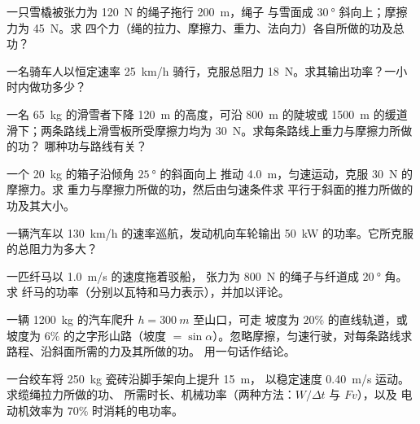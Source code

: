 \begin{exercise}[$\star\star$]\label{exo:g11:work-of-force:6}
一只雪橇被张力为 \qty{120}{N} 的绳子拖行 \qty{200}{m}，绳子
与雪面成 $\qty{30}{\degree}$ 斜向上；摩擦力为 \qty{45}{N}。求
四个力（绳的拉力、摩擦力、重力、法向力）各自所做的功及总功？
\end{exercise}

\begin{exercise}[$\star\star$]\label{exo:g11:work-of-force:7}
一名骑车人以恒定速率 \qty{25}{km/h} 骑行，克服总阻力
\qty{18}{N}。求其输出功率？一小时内做功多少？
\end{exercise}

\begin{exercise}[$\star\star$]\label{exo:g11:work-of-force:8}
一名 \qty{65}{kg} 的滑雪者下降 \qty{120}{m} 的高度，可沿 \qty{800}{m}
的陡坡或 \qty{1500}{m} 的缓道滑下；两条路线上滑雪板所受摩擦力均为
\qty{30}{N}。求每条路线上重力与摩擦力所做的功？
哪种功与路线有关？
\end{exercise}

\begin{exercise}[$\star\star$]\label{exo:g11:work-of-force:9}
一个 \qty{20}{kg} 的箱子沿倾角 $\qty{25}{\degree}$ 的斜面向上
推动 \qty{4.0}{m}，匀速运动，克服 \qty{30}{N} 的摩擦力。求
重力与摩擦力所做的功，然后由匀速条件求
平行于斜面的推力所做的功及其大小。
\end{exercise}

\begin{exercise}[$\star\star$]\label{exo:g11:work-of-force:10}
一辆汽车以 \qty{130}{km/h} 的速率巡航，发动机向车轮输出
\qty{50}{kW} 的功率。它所克服的总阻力为多大？
\end{exercise}

\begin{exercise}[$\star\star$]\label{exo:g11:work-of-force:11}
一匹纤马以 \qty{1.0}{m/s} 的速度拖着驳船，
张力为 \qty{800}{N} 的绳子与纤道成 $\qty{20}{\degree}$ 角。求
纤马的功率（分别以瓦特和马力表示），并加以评论。
\end{exercise}

\begin{exercise}[$\star\star\star$]\label{exo:g11:work-of-force:12}
一辆 \qty{1200}{kg} 的汽车爬升 $h = \qty{300}{m}$ 至山口，可走
坡度为 $20\%$ 的直线轨道，或坡度为 $6\%$ 的之字形山路（坡度 $=
\sin\alpha$）。忽略摩擦，匀速行驶，对每条路线求
路程、沿斜面所需的力及其所做的功。
用一句话作结论。
\end{exercise}

\begin{exercise}[$\star\star\star$]\label{exo:g11:work-of-force:13}
一台绞车将 \qty{250}{kg} 瓷砖沿脚手架向上提升 \qty{15}{m}，
以稳定速度 \qty{0.40}{m/s} 运动。求缆绳拉力所做的功、
所需时长、机械功率（两种方法：$W/\Delta t$ 与 $Fv$），以及
电动机效率为 $70\%$ 时消耗的电功率。
\end{exercise}

